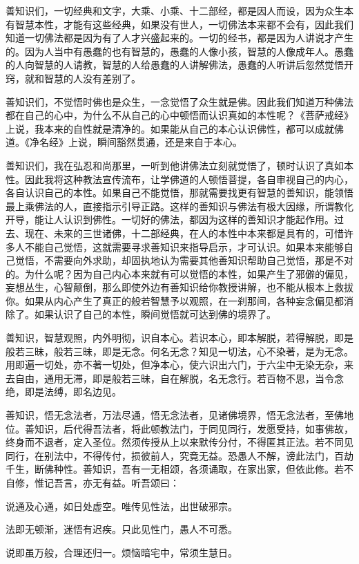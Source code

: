 \documentclass[12pt,twoside,openany]{book}
\begin{document}
{善知识们，一切经典和文字，大乘、小乘、十二部经，都是因人而设，因为众生本有智慧本性，才能有这些经典，如果没有世人，一切佛法本来都不会有，因此我们知道一切佛法都是因为有了人才兴盛起来的。一切的经书，都是因为人讲说才产生的。因为人当中有愚蠢的也有智慧的，愚蠢的人像小孩，智慧的人像成年人。愚蠢的人向智慧的人请教，智慧的人给愚蠢的人讲解佛法，愚蠢的人听讲后忽然觉悟开窍，就和智慧的人没有差别了。

善知识们，不觉悟时佛也是众生，一念觉悟了众生就是佛。因此我们知道万种佛法都在自己的心中，为什么不从自己的心中顿悟而认识真如的本性呢？《菩萨戒经》上说，我本来的自性就是清净的。如果能从自己的本心认识佛性，都可以成就佛道。《净名经》上说，瞬间豁然贯通，还是来自于本心。

善知识们，我在弘忍和尚那里，一听到他讲佛法立刻就觉悟了，顿时认识了真如本性。因此我将这种教法宣传流布，让学佛道的人顿悟菩提，各自审视自己的内心，各自认识自己的本性。如果自己不能觉悟，那就需要找更有智慧的善知识，能领悟最上乘佛法的人，直接指示引导正路。这样的善知识与佛法有极大因缘，所谓教化开导，能让人认识到佛性。一切好的佛法，都因为这样的善知识才能起作用。过去、现在、未来的三世诸佛，十二部经典，在人的本性中本来都是具有的，可惜许多人不能自己觉悟，这就需要寻求善知识来指导启示，才可认识。如果本来能够自己觉悟，不需要向外求助，却固执地认为需要其他善知识帮助自己觉悟，那是不对的。为什么呢？因为自己内心本来就有可以觉悟的本性，如果产生了邪僻的偏见，妄想丛生，心智颠倒，那么即使外边有善知识给你教授讲解，也不能从根本上救拔你。如果从内心产生了真正的般若智慧予以观照，在一刹那间，各种妄念偏见都消除了。如果认识了自己的本性，瞬间觉悟就可达到佛的境界了。}

善知识，智慧观照，内外明彻，识自本心。若识本心，即本解脱，若得解脱，即是般若三昧，般若三昧，即是无念。何名无念？知见一切法，心不染著，是为无念。用即遍一切处，亦不著一切处，但净本心，使六识出六门，于六尘中无染无杂，来去自由，通用无滞，即是般若三昧，自在解脱，名无念行。若百物不思，当令念绝，即是法缚，即名边见。

善知识，悟无念法者，万法尽通，悟无念法者，见诸佛境界，悟无念法者，至佛地位。善知识，后代得吾法者，将此顿教法门，于同见同行，发愿受持，如事佛故，终身而不退者，定入圣位。然须传授从上以来默传分付，不得匿其正法。若不同见同行，在别法中，不得传付，损彼前人，究竟无益。恐愚人不解，谤此法门，百劫千生，断佛种性。善知识，吾有一无相颂，各须诵取，在家出家，但依此修。若不自修，惟记吾言，亦无有益。听吾颂曰：

说通及心通，如日处虚空。唯传见性法，出世破邪宗。

法即无顿渐，迷悟有迟疾。只此见性门，愚人不可悉。

说即虽万般，合理还归一。烦恼暗宅中，常须生慧日。
\end{document}
